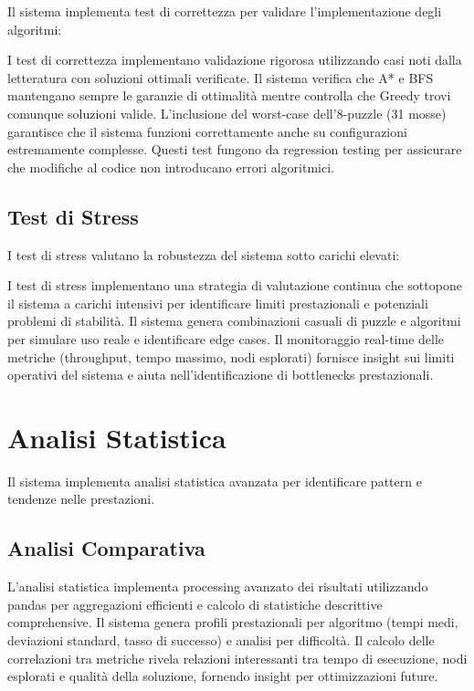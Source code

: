 \documentclass[12pt,a4paper]{report}
\theoremstyle{definition}
\begin{document}
Il sistema implementa test di correttezza per validare l'implementazione degli algoritmi:

I test di correttezza implementano validazione rigorosa utilizzando casi noti dalla letteratura con soluzioni ottimali verificate. Il sistema verifica che A* e BFS mantengano sempre le garanzie di ottimalità mentre controlla che Greedy trovi comunque soluzioni valide. L'inclusione del worst-case dell'8-puzzle (31 mosse) garantisce che il sistema funzioni correttamente anche su configurazioni estremamente complesse. Questi test fungono da regression testing per assicurare che modifiche al codice non introducano errori algoritmici.

\subsection{Test di Stress}

I test di stress valutano la robustezza del sistema sotto carichi elevati:

I test di stress implementano una strategia di valutazione continua che sottopone il sistema a carichi intensivi per identificare limiti prestazionali e potenziali problemi di stabilità. Il sistema genera combinazioni casuali di puzzle e algoritmi per simulare uso reale e identificare edge cases. Il monitoraggio real-time delle metriche (throughput, tempo massimo, nodi esplorati) fornisce insight sui limiti operativi del sistema e aiuta nell'identificazione di bottlenecks prestazionali.

\section{Analisi Statistica}

Il sistema implementa analisi statistica avanzata per identificare pattern e tendenze nelle prestazioni.

\subsection{Analisi Comparativa}

L'analisi statistica implementa processing avanzato dei risultati utilizzando pandas per aggregazioni efficienti e calcolo di statistiche descrittive comprehensive. Il sistema genera profili prestazionali per algoritmo (tempi medi, deviazioni standard, tasso di successo) e analisi per difficoltà. Il calcolo delle correlazioni tra metriche rivela relazioni interessanti tra tempo di esecuzione, nodi esplorati e qualità della soluzione, fornendo insight per ottimizzazioni future.
\end{document}
